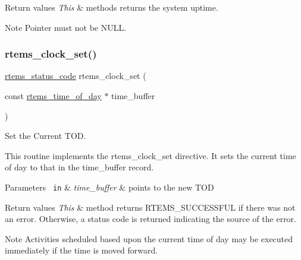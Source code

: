 \begin{DoxyRetVals}{Return values}
{\em This} & methods returns the system uptime.\\
\hline
\end{DoxyRetVals}
\begin{DoxyNote}{Note}
Pointer must not be N\+U\+LL. 
\end{DoxyNote}
\mbox{\label{group__ClassicClock_ga3e9ce997911dc911dac29c8d9c8b6250}} 
\subsubsection{\texorpdfstring{rtems\_clock\_set()}{rtems\_clock\_set()}}
{\footnotesize\ttfamily \mbox{\hyperlink{group__ClassicStatus_ga545d41846817eaba6143d52ee4d9e9fe}{rtems\+\_\+status\+\_\+code}} rtems\+\_\+clock\+\_\+set (\begin{DoxyParamCaption}\item[{const \mbox{\hyperlink{structrtems__time__of__day}{rtems\+\_\+time\+\_\+of\+\_\+day}} $\ast$}]{time\+\_\+buffer }\end{DoxyParamCaption})}



Set the Current T\+OD. 

This routine implements the rtems\+\_\+clock\+\_\+set directive. It sets the current time of day to that in the time\+\_\+buffer record.


\begin{DoxyParams}[1]{Parameters}
\mbox{\texttt{ in}}  & {\em time\+\_\+buffer} & points to the new T\+OD\\
\hline
\end{DoxyParams}

\begin{DoxyRetVals}{Return values}
{\em This} & method returns R\+T\+E\+M\+S\+\_\+\+S\+U\+C\+C\+E\+S\+S\+F\+UL if there was not an error. Otherwise, a status code is returned indicating the source of the error.\\
\hline
\end{DoxyRetVals}
\begin{DoxyNote}{Note}
Activities scheduled based upon the current time of day may be executed immediately if the time is moved forward. 
\end{DoxyNote}
\mbox{\label{group__ClassicClock_ga4077e5036c6378d557be5c22ba30812d}} 

